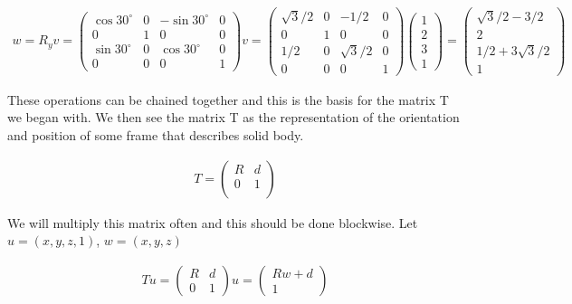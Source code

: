 \[\begin{aligned}
w = R_yv = \begin{pmatrix}\cos 30^\circ & 0 & -\sin 30^\circ & 0  \\ 0 & 1 & 0 & 0\\
         \sin 30^\circ &0& \cos 30^\circ & 0 \\  0& 0& 0& 1 \end{pmatrix}v
    = \begin{pmatrix}\sqrt{3}/2 & 0 & -1/2 & 0  \\ 0 & 1 & 0 & 0\\
             1/2 &0& \sqrt{3}/2& 0 \\  0& 0& 0& 1 \end{pmatrix} \begin{pmatrix} 1 \\ 2 \\ 3\\ 1\end{pmatrix}
    = \begin{pmatrix} \sqrt{3}/2 - 3/2 \\ 2 \\ 1/2 + 3\sqrt{3}/2\\ 1\end{pmatrix}
\end{aligned}\]

These operations can be chained together and this is the basis for the
matrix T we began with. We then see the matrix T as the representation
of the orientation and position of some frame that describes solid body.

\[\begin{aligned}
T  =
\begin{pmatrix}
R  & d \\
0 & 1\\
\end{pmatrix}
\end{aligned}\]

We will multiply this matrix often and this should be done blockwise.
Let \(u = (x,y,z,1)\), \(w = (x,y,z)\)

\[\begin{aligned}
Tu = \begin{pmatrix} R & d \\ 0 & 1 \end{pmatrix} u = \begin{pmatrix} Rw + d \\ 1 \end{pmatrix}
\end{aligned}\]

